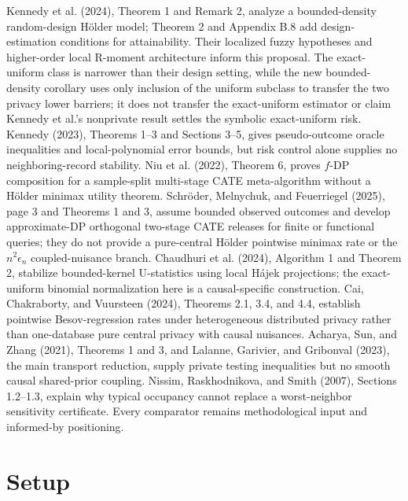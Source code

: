 \documentclass{article}
\begin{document}
Kennedy et al. (2024), Theorem 1 and Remark 2, analyze a bounded-density random-design Hölder model; Theorem 2 and Appendix B.8 add design-estimation conditions for attainability. Their localized fuzzy hypotheses and higher-order local R-moment architecture inform this proposal. The exact-uniform class is narrower than their design setting, while the new bounded-density corollary uses only inclusion of the uniform subclass to transfer the two privacy lower barriers; it does not transfer the exact-uniform estimator or claim Kennedy et al.'s nonprivate result settles the symbolic exact-uniform risk. Kennedy (2023), Theorems 1--3 and Sections 3--5, gives pseudo-outcome oracle inequalities and local-polynomial error bounds, but risk control alone supplies no neighboring-record stability. Niu et al. (2022), Theorem 6, proves \(f\)-DP composition for a sample-split multi-stage CATE meta-algorithm without a Hölder minimax utility theorem. Schröder, Melnychuk, and Feuerriegel (2025), page 3 and Theorems 1 and 3, assume bounded observed outcomes and develop approximate-DP orthogonal two-stage CATE releases for finite or functional queries; they do not provide a pure-central Hölder pointwise minimax rate or the \(n^2\epsilon_n\) coupled-nuisance branch. Chaudhuri et al. (2024), Algorithm 1 and Theorem 2, stabilize bounded-kernel U-statistics using local Hájek projections; the exact-uniform binomial normalization here is a causal-specific construction. Cai, Chakraborty, and Vuursteen (2024), Theorems 2.1, 3.4, and 4.4, establish pointwise Besov-regression rates under heterogeneous distributed privacy rather than one-database pure central privacy with causal nuisances. Acharya, Sun, and Zhang (2021), Theorems 1 and 3, and Lalanne, Garivier, and Gribonval (2023), the main transport reduction, supply private testing inequalities but no smooth causal shared-prior coupling. Nissim, Raskhodnikova, and Smith (2007), Sections 1.2--1.3, explain why typical occupancy cannot replace a worst-neighbor sensitivity certificate. Every comparator remains methodological input and informed-by positioning.

\section{Setup}
\end{document}
